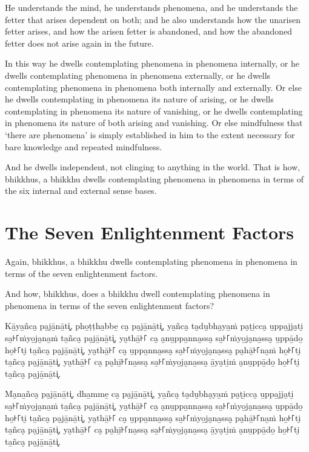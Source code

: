 He understands the mind, he understands phenomena, and he understands the fetter
that arises dependent on both; and he also understands how the unarisen fetter
arises, and how the arisen fetter is abandoned, and how the abandoned fetter
does not arise again in the future.

In this way he dwells contemplating phenomena in phenomena internally, or he
dwells contemplating phenomena in phenomena externally, or he dwells
contemplating phenomena in phenomena both internally and externally. Or else he
dwells contemplating in phenomena its nature of arising, or he dwells
contemplating in phenomena its nature of vanishing, or he dwells contemplating
in phenomena its nature of both arising and vanishing. Or else mindfulness that
‘there are phenomena’ is simply established in him to the extent necessary for
bare knowledge and repeated mindfulness.

And he dwells independent, not clinging to anything in the world. That is how,
bhikkhus, a bhikkhu dwells contemplating phenomena in phenomena in terms of the
six internal and external sense bases.


\section{The Seven Enlightenment Factors}

Again, bhikkhus, a bhikkhu dwells contemplating phenomena in phenomena in terms
of the seven enlightenment factors.

And how, bhikkhus, does a bhikkhu dwell contemplating phenomena in phenomena in
terms of the seven enlightenment factors?

\paliPage

Kā̱ya̱ñca̮ pa̮jā̱nā̱ti͓,
pho̱ṭṭha̱bbe̱ ca̮ pa̮jā̱nā̱ti͓,
ya̱ñca̮ ta̮du̮bha̮ya̱ṁ pa̮ṭi̱cca̮ u̱ppa̱jja̮ti̮ sa̱꜔꜒ṁyo̱ja̮na̱ṁ ta̱ñca̮ pa̮jā̱nā̱ti͓,
ya̮thā̱꜔꜒ ca̮ a̮nu̱ppa̱nna̱ssa̮ sa̱꜔꜒ṁyo̱ja̮na̱ssa̮ u̱ppā̱do̱ ho̱꜔꜒ti̮ ta̱ñca̮ pa̮jā̱nā̱ti͓,
ya̮thā̱꜔꜒ ca̮ u̱ppa̱nna̱ssa̮ sa̱꜔꜒ṁyo̱ja̮na̱ssa̮ pa̮hā̱꜔꜒na̱ṁ ho̱꜔꜒ti̮ ta̱ñca̮ pa̮jā̱nā̱ti͓,
ya̮thā̱꜔꜒ ca̮ pa̮hī̱꜔꜒na̱ssa̮ sa̱꜔꜒ṁyo̱ja̮na̱ssa̮ ā̱ya̮ti̱ṁ a̮nu̱ppā̱do̱ ho̱꜔꜒ti̮ ta̱ñca̮ pa̮jā̱nā̱ti͓.

Ma̮na̱ñca̮ pa̮jā̱nā̱ti͓,
dha̱mme̱ ca̮ pa̮jā̱nā̱ti͓,
ya̱ñca̮ ta̮du̮bha̮ya̱ṁ pa̮ṭi̱cca̮ u̱ppa̱jja̮ti̮ sa̱꜔꜒ṁyo̱ja̮na̱ṁ ta̱ñca̮ pa̮jā̱nā̱ti͓,
ya̮thā̱꜔꜒ ca̮ a̮nu̱ppa̱nna̱ssa̮ sa̱꜔꜒ṁyo̱ja̮na̱ssa̮ u̱ppā̱do̱ ho̱꜔꜒ti̮ ta̱ñca̮ pa̮jā̱nā̱ti͓,
ya̮thā̱꜔꜒ ca̮ u̱ppa̱nna̱ssa̮ sa̱꜔꜒ṁyo̱ja̮na̱ssa̮ pa̮hā̱꜔꜒na̱ṁ ho̱꜔꜒ti̮ ta̱ñca̮ pa̮jā̱nā̱ti͓,
ya̮thā̱꜔꜒ ca̮ pa̮hī̱꜔꜒na̱ssa̮ sa̱꜔꜒ṁyo̱ja̮na̱ssa̮ ā̱ya̮ti̱ṁ a̮nu̱ppā̱do̱ ho̱꜔꜒ti̮ ta̱ñca̮ pa̮jā̱nā̱ti͓.

